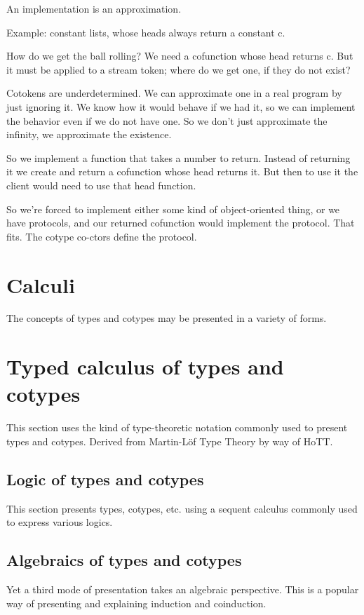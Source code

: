 An implementation is an approximation.

Example: constant lists, whose heads always return a constant c.

How do we get the ball rolling? We need a cofunction whose head
returns c. But it must be applied to a stream token; where do we get
one, if they do not exist?

Cotokens are underdetermined. We can approximate one in a real program
by just ignoring it. We know how it would behave if we had it, so we
can implement the behavior even if we do not have one.  So we don't just approximate the infinity, we approximate the existence.

So we implement a  function that takes a number to
return. Instead of returning it we create and return a cofunction
whose head returns it. But then to use it the client would need to use
that head function.

So we're forced to implement either some kind of object-oriented
thing, or we have protocols, and our returned cofunction would
implement the protocol. That fits. The cotype co-ctors define the
protocol.


\section{Calculi}
The concepts of types and cotypes may be presented in a variety of forms.

\section{Typed calculus of types and cotypes}

This section uses the kind of type-theoretic notation commonly used to
present types and cotypes. Derived from Martin-Löf Type Theory by way
of HoTT.

\subsection{Logic of types and cotypes}

This section presents types, cotypes, etc. using a sequent calculus
commonly used to express various logics.

\subsection{Algebraics of types and cotypes}

Yet a third mode of presentation takes an algebraic perspective. This
is a popular way of presenting and explaining induction and
coinduction.

